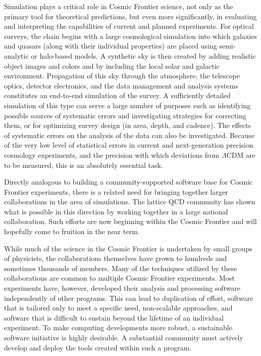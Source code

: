 Simulation plays a critical role in Cosmic Frontier science, not only
as the primary tool for theoretical predictions, but even more
significantly, in evaluating and interpreting the capabilities of
current and planned experiments. For optical surveys, the chain begins
with a large cosmological simulation into which galaxies and quasars
(along with their individual properties) are placed using
semi-analytic or halo-based models. A synthetic sky is then created by
adding realistic object images and colors and by including the local
solar and galactic environment. Propagation of this sky through the
atmosphere, the telescope optics, detector electronics, and the data
management and analysis systems constitutes an end-to-end simulation
of the survey. A sufficiently detailed simulation of this type can
serve a large number of purposes such as identifying possible sources
of systematic errors and investigating strategies for correcting them,
or for optimizing survey design (in area, depth, and cadence). The
effects of systematic errors on the analysis of the data can also be
investigated. Because of the very low level of statistical errors in
current and next-generation precision cosmology experiments, and the
precision with which deviations from $\Lambda$CDM are to be measured,
this is an absolutely essential task.

Directly analogous to building a community-supported software base for
Cosmic Frontier experiments, there is a related need for bringing
together larger collaborations in the area of simulations. The lattice
QCD community has shown what is possible in this direction by working
together in a large national collaboration. Such efforts are now
beginning within the Cosmic Frontier and will hopefully come to
fruition in the near term.

While much of the science in the Cosmic Frontier is undertaken by
small groups of physicists, the collaborations themselves have grown
to hundreds and sometimes thousands of members. Many of the techniques
utilized by these collaborations are common to multiple Cosmic
Frontier experiments. Most experiments have, however, developed their
analysis and processing software independently of other programs. This
can lead to duplication of effort, software that is tailored only to
meet a specific need, non-scalable approaches, and software that is
difficult to sustain beyond the lifetime of an individual
experiment. To make computing developments more robust, a sustainable
software initiative is highly desirable. A substantial community must actively
develop and deploy the tools created within such a program.


